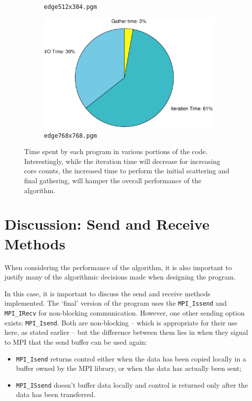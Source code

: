 \documentclass{article} %
\newcommand{\tp}{\texttt}
\begin{document}
\begin{figure}
\begin{subfigure}[b]{.4\textwidth}
    \caption{\texttt{edge512x384.pgm}}
    \label{fig:shares16}
\end{subfigure}
\hfill
\begin{subfigure}[b]{.4\textwidth}
    \centering
    \includegraphics[width=\textwidth]{figures/shares198_48}
    \caption{\texttt{edge768x768.pgm}}
    \label{fig:shares48}
\end{subfigure}
\caption{Time spent by each program in various portions of the code. Interestingly, while the iteration time will decrease for increasing core counts, the increased time to perform the initial scattering and final gathering, will hamper the overall performance of the algorithm.}
\label{f:shares}
\end{figure}

\section*{Discussion: Send and Receive Methods}

When considering the performance of the algorithm, it is also important to justify many of the algorithmic decisions made when designing the program.

In this case, it is important to discuss the send and receive methods implemented. The `final' version of the program uses the \texttt{MPI\_Issend} and \texttt{MPI\_IRecv} for non-blocking communication. 
However, one other sending option exists: \texttt{MPI\_Isend}.
Both are non-blocking -- which is appropriate for their use here, as stated earlier -- but the difference between them lies in when they signal to MPI that the send buffer can be used again:

\begin{itemize}
    \item \tp{MPI\_Isend} returns control either when the data has been copied locally in a buffer owned by the MPI library, or when the data has actually been sent;
    \item \tp{MPI\_ISsend} doesn't buffer data locally and control is returned only after the data has been transferred.
\end{itemize} 
\end{document}
